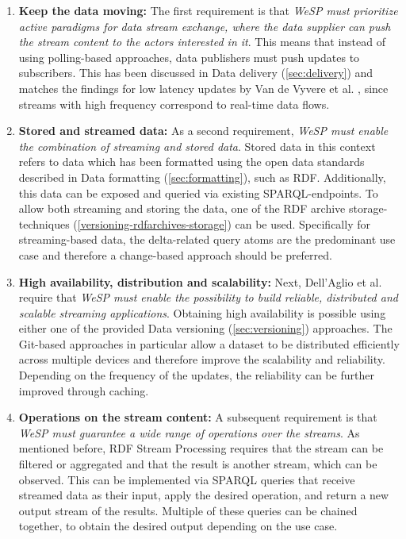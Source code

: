 \begin{enumerate}
    \item \textbf{Keep the data moving:} The first requirement is that \emph{WeSP must prioritize active paradigms for data stream exchange, where the data supplier can push the stream content to the actors interested in it}. This means that instead of using polling-based approaches, data publishers must push updates to subscribers. This has been discussed in Data delivery (\cref{sec:delivery}) and matches the findings for low latency updates by Van de Vyvere et al. \cite{van2020comparing,10.1145/3184558.3191650}, since streams with high frequency correspond to real-time data flows.

    \item \textbf{Stored and streamed data:} As a second requirement, \emph{WeSP must enable the combination of streaming and stored data}. Stored data in this context refers to data which has been formatted using the open data standards described in Data formatting (\cref{sec:formatting}), such as RDF. Additionally, this data can be exposed and queried via existing SPARQL-endpoints. To allow both streaming and storing the data, one of the RDF archive storage-techniques (\cref{versioning-rdfarchives-storage}) can be used. Specifically for streaming-based data, the delta-related query atoms are the predominant use case and therefore a change-based approach should be preferred.

    \item \textbf{High availability, distribution and scalability:} Next, Dell'Aglio et al. \cite{webofdatastreams} require that \emph{WeSP must enable the possibility to build reliable, distributed and scalable streaming applications}. Obtaining high availability is possible using either one of the provided Data versioning (\cref{sec:versioning}) approaches. The Git-based approaches in particular allow a dataset to be distributed efficiently across multiple devices and therefore improve the scalability and reliability. Depending on the frequency of the updates, the reliability can be further improved through caching.

    \item \textbf{Operations on the stream content:} A subsequent requirement is that \emph{WeSP must guarantee a wide range of operations over the streams}. As mentioned before, RDF Stream Processing requires that the stream can be filtered or aggregated and that the result is another stream, which can be observed. This can be implemented via SPARQL queries that receive streamed data as their input, apply the desired operation, and return a new output stream of the results. Multiple of these queries can be chained together, to obtain the desired output depending on the use case.


\end{enumerate}
